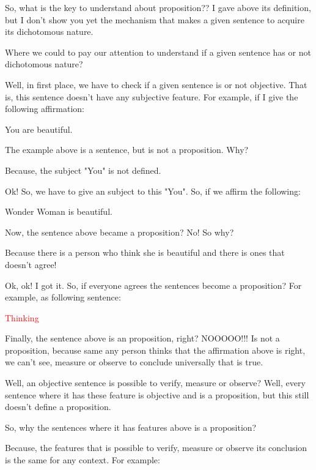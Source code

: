 So, what is the key to understand about proposition?? I gave above its definition, but I don't show you yet the mechanism that makes a given sentence to acquire its dichotomous nature.

Where we could to pay our attention to understand if a given sentence has or not dichotomous nature?

Well, in first place, we have to check if a given sentence is or not objective. That is, this sentence doesn't have any subjective feature. For example, if I give the following affirmation:

\begin{example}\label{exemplo1}
    You are beautiful.
\end{example}

The example above is a sentence, but is not a proposition. Why?

Because, the subject "You" is not defined.

Ok! So, we have to give an subject to this "You". So, if we affirm the following:

\begin{example}
    Wonder Woman is beautiful.
\end{example}

Now, the sentence above became a proposition? No! So why?

Because there is a person who think she is beautiful and there is ones that doesn't agree!

Ok, ok! I got it. So, if everyone agrees the sentences become a proposition? For example, as following sentence:

\begin{example}[\textcolor{red}{A sentence that is subjective and everyone agree (this is very difficult)}]
    \textcolor{red}{Thinking}
\end{example}

Finally, the sentence above is an proposition, right? NOOOOO!!! Is not a proposition, because same any person thinks that the affirmation above is right, we can't see, measure or observe to conclude universally that is true.

Well, an objective sentence is possible to verify, measure or observe? Well, every sentence where it has these feature is objective and is a proposition, but this still doesn't define a proposition.

So, why the sentences where it has features above is a proposition?

Because, the features that is possible to verify, measure or observe its conclusion is the same for any context. For example:

